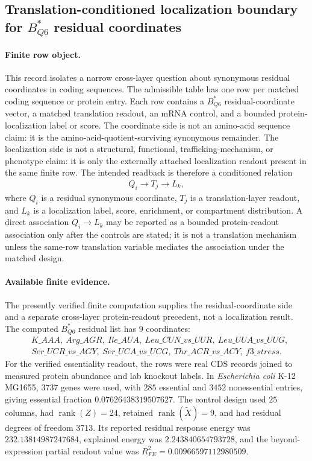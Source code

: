 \subsection{Translation-conditioned localization boundary for $B^{*}_{Q6}$ residual coordinates}
\label{subsec:q6-translation-conditioned-protein-localization-boundary-cross-layer}

\paragraph{Finite row object.}
This record isolates a narrow cross-layer question about synonymous residual coordinates in coding sequences.  The admissible table has one row per matched coding sequence or protein entry.  Each row contains a $B^{*}_{Q6}$ residual-coordinate vector, a matched translation readout, an mRNA control, and a bounded protein-localization label or score.  The coordinate side is not an amino-acid sequence claim: it is the amino-acid-quotient-surviving synonymous remainder.  The localization side is not a structural, functional, trafficking-mechanism, or phenotype claim: it is only the externally attached localization readout present in the same finite row.  The intended readback is therefore a conditioned relation
$$
\begin{aligned}
  Q_i \longrightarrow T_j \longrightarrow L_k,
\end{aligned}
$$
where $Q_i$ is a residual synonymous coordinate, $T_j$ is a translation-layer readout, and $L_k$ is a localization label, score, enrichment, or compartment distribution.  A direct association $Q_i \to L_k$ may be reported as a bounded protein-readout association only after the controls are stated; it is not a translation mechanism unless the same-row translation variable mediates the association under the matched design.

\paragraph{Available finite evidence.}
The presently verified finite computation supplies the residual-coordinate side and a separate cross-layer protein-readout precedent, not a localization result.  The computed $B^{*}_{Q6}$ residual list has $9$ coordinates:
$$
\begin{aligned}
  &K\_AAA,\ Arg\_AGR,\ Ile\_AUA,\ Leu\_CUN\_vs\_UUR,\ Leu\_UUA\_vs\_UUG,\\
  &Ser\_UCR\_vs\_AGY,\ Ser\_UCA\_vs\_UCG,\ Thr\_ACR\_vs\_ACY,\ f3\_stress.
\end{aligned}
$$
For the verified essentiality readout, the rows were real CDS records joined to measured protein abundance and lab knockout labels.  In \emph{Escherichia coli} K-12 MG1655, $3737$ genes were used, with $285$ essential and $3452$ nonessential entries, giving essential fraction $0.07626438319507627$.  The control design used $25$ columns, had $\operatorname{rank}(Z)=24$, retained $\operatorname{rank}(\widetilde X)=9$, and had residual degrees of freedom $3713$.  Its reported residual response energy was $232.13814987247684$, explained energy was $2.243840654793728$, and the beyond-expression partial readout value was $R^2_{FE}=0.00966597112980509$.

